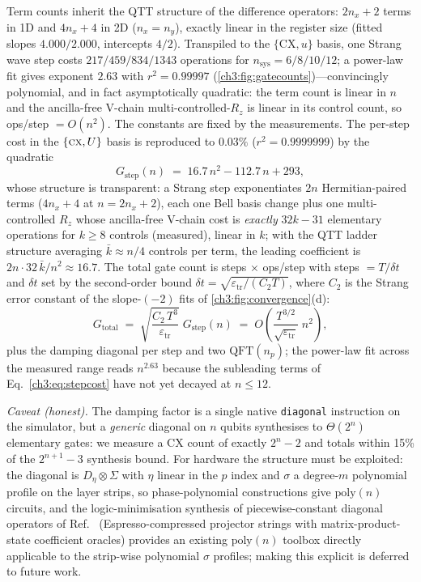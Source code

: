 Term counts inherit the QTT structure of the difference operators:
$2n_x+2$ terms in 1D and $4n_x+4$ in 2D ($n_x=n_y$), exactly linear in
the register size (fitted slopes $4.000/2.000$, intercepts $4/2$).
Transpiled to the $\{\mathrm{CX},u\}$ basis, one Strang wave step costs
$217/459/834/1343$ operations for $n_{\mathrm{sys}}=6/8/10/12$; a
power-law fit gives exponent $2.63$ with $r^{2}=0.99997$
(\ref{ch3:fig:gatecounts})---convincingly polynomial, and in fact
asymptotically quadratic: the term count is linear in $n$ and the
ancilla-free V-chain multi-controlled-$R_z$ is linear in its control
count, so ops/step $=O(n^{2})$.  The constants are fixed by the
measurements.  The per-step cost in the
$\{\textsc{cx}, U\}$ basis is reproduced to $0.03\%$
($r^{2}=0.9999999$) by the quadratic
\begin{equation}
  G_{\mathrm{step}}(n) \;=\; 16.7\,n^{2} - 112.7\,n + 293,
  \label{ch3:eq:stepcost}
\end{equation}
whose structure is transparent: a Strang step exponentiates $2n$
Hermitian-paired terms ($4n_x+4$ at $n=2n_x+2$), each one Bell basis
change plus one multi-controlled $R_z$ whose ancilla-free V-chain cost
is \emph{exactly} $32k-31$ elementary operations for $k\ge8$ controls
(measured), linear in $k$; with the QTT ladder structure averaging
$\bar k\approx n/4$ controls per term, the leading coefficient is
$2n\cdot32\,\bar k/n^{2}\approx16.7$.  The total gate count is steps
$\times$ ops/step with steps $= T/\delta t$ and $\delta t$ set by the
second-order bound $\delta t = \sqrt{\varepsilon_{\mathrm{tr}}/(C_2
T)}$, where $C_2$ is the Strang error constant of the slope-$(-2)$ fits
of \ref{ch3:fig:convergence}(d):
\begin{equation}
  G_{\mathrm{total}}
  \;=\; \sqrt{\frac{C_2\,T^{3}}{\varepsilon_{\mathrm{tr}}}}\;
        G_{\mathrm{step}}(n)
  \;=\; O\!\left(\frac{T^{3/2}}{\sqrt{\varepsilon_{\mathrm{tr}}}}\;
        n^{2}\right),
  \label{ch3:eq:totalcost}
\end{equation}
plus the damping diagonal per step and two $\mathrm{QFT}(n_p)$; the
power-law fit across the measured range reads $n^{2.63}$ because the
subleading terms of Eq.~\eqref{ch3:eq:stepcost} have not yet decayed at
$n\le12$.

\emph{Caveat (honest).}  The damping factor is a single native
\texttt{diagonal} instruction on the simulator, but a \emph{generic}
diagonal on $n$ qubits synthesises to $\Theta(2^{n})$ elementary gates:
we measure a CX count of exactly $2^{n}-2$ and totals within 15\% of the
$2^{n+1}-3$ synthesis bound.  For hardware the structure must be
exploited: the diagonal is $D_\eta\otimes\Sigma$ with $\eta$ linear in
the $p$ index and $\sigma$ a degree-$m$ polynomial profile on the layer
strips, so phase-polynomial constructions give $\mathrm{poly}(n)$
circuits, and the logic-minimisation synthesis of piecewise-constant
diagonal operators of Ref.~\cite{sato2025nonconservative}
(Espresso-compressed projector strings with matrix-product-state
coefficient oracles) provides an existing $\mathrm{poly}(n)$ toolbox
directly applicable to the strip-wise polynomial $\sigma$ profiles;
making this explicit is deferred to future work.

